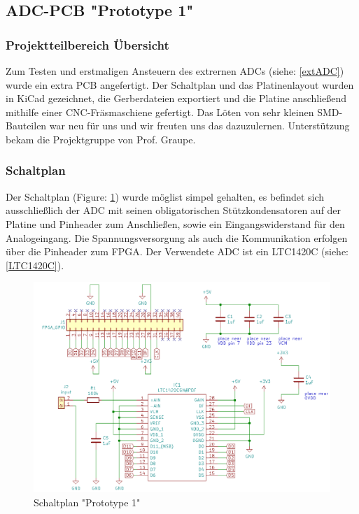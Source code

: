 \subsection{ADC-PCB "Prototype 1"} \label{Prototype1}
\subsubsection{Projektteilbereich Übersicht}
Zum Testen und erstmaligen Ansteuern des extrernen ADCs (siehe: \ref{extADC}) wurde ein extra PCB angefertigt. Der Schaltplan und das Platinenlayout wurden in KiCad gezeichnet, die Gerberdateien exportiert und die Platine anschließend mithilfe einer CNC-Fräsmaschiene gefertigt. Das Löten von sehr kleinen SMD-Bauteilen war neu für uns und wir freuten uns das dazuzulernen. Unterstützung bekam die Projektgruppe von Prof. Graupe. 

\subsubsection{Schaltplan}
Der Schaltplan (Figure: \ref{Prot1_Schalt}) wurde möglist simpel gehalten, es befindet sich ausschließlich der ADC mit seinen obligatorischen Stützkondensatoren auf der Platine und Pinheader zum Anschließen, sowie ein Eingangswiderstand für den Analogeingang. Die Spannungsversorgung als auch die Kommunikation erfolgen über die Pinheader zum FPGA. Der Verwendete ADC ist ein LTC1420C (siehe: \ref{LTC1420C}).
\begin{figure}[h!]
\begin{center}
\includegraphics[width = 15cm]{SAUER/Grafiken/Prot1/Prot1_Schalt.png}
\caption{Schaltplan "Prototype 1"}
\label{Prot1_Schalt}
\end{center}
\end{figure}

